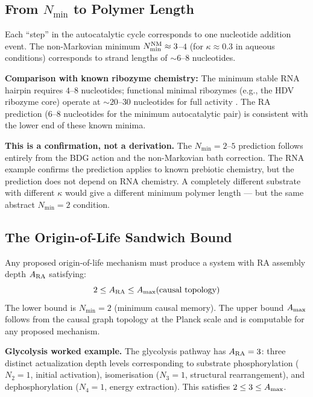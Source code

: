 \documentclass[12pt,a4paper]{article}
\begin{document}
\subsection{From $N_{\min}$ to Polymer Length}

Each ``step'' in the autocatalytic cycle corresponds to one nucleotide addition event.  The non-Markovian minimum $N_{\min}^{\rm NM}\approx3$--$4$ (for $\kappa\approx0.3$ in aqueous conditions) corresponds to strand lengths of $\sim6$--$8$ nucleotides.

\textbf{Comparison with known ribozyme chemistry:}  The minimum stable RNA hairpin requires $4$--$8$ nucleotides; functional minimal ribozymes (e.g., the HDV ribozyme core) operate at $\sim20$--$30$ nucleotides for full activity \cite{Joyce2018}.  The RA prediction ($6$--$8$ nucleotides for the minimum autocatalytic pair) is consistent with the lower end of these known minima.

\textbf{This is a confirmation, not a derivation.}  The $N_{\min}=2$--$5$ prediction follows entirely from the BDG action and the non-Markovian bath correction.  The RNA example confirms the prediction applies to known prebiotic chemistry, but the prediction does not depend on RNA chemistry.  A completely different substrate with different $\kappa$ would give a different minimum polymer length --- but the same abstract $N_{\min}=2$ condition.

\subsection{The Origin-of-Life Sandwich Bound}

Any proposed origin-of-life mechanism must produce a system with RA assembly depth $A_{\rm RA}$ satisfying:
\begin{equation}
  2 \leq A_{\rm RA} \leq A_{\rm max}(\text{causal topology})
  \label{eq:sandwich}
\end{equation}
The lower bound is $N_{\min}=2$ (minimum causal memory).  The upper bound $A_{\rm max}$ follows from the causal graph topology at the Planck scale and is computable for any proposed mechanism.

\textbf{Glycolysis worked example.}  The glycolysis pathway has $A_{\rm RA}=3$: three distinct actualization depth levels corresponding to substrate phosphorylation ($N_2=1$, initial activation), isomerisation ($N_3=1$, structural rearrangement), and dephosphorylation ($N_4=1$, energy extraction).  This satisfies $2\leq3\leq A_{\rm max}$.
\end{document}
